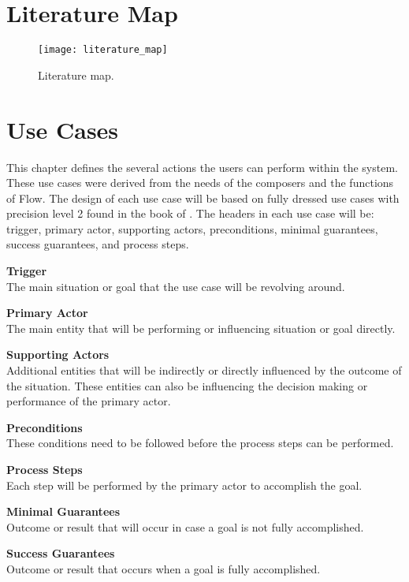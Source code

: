 \chapter{Literature Map}
\label{sec:appendixe}


\begin{sidewaysfigure}[h]
	\texttt{[image: literature\_map]}
    \caption{Literature map.}
    \label{fig:literature-map}
\end{sidewaysfigure}

\chapter{Use Cases}

  This chapter defines the several actions the users can perform within the system. These use cases were derived from the needs of the composers and the functions of Flow. The design of each use case will be based on fully dressed use cases with precision level 2 found in the book of \cite{alistair2001writing}. The headers in each use case will be: trigger, primary actor, supporting actors, preconditions, minimal guarantees, success guarantees, and process steps.

  \textbf{Trigger} \\
  The main situation or goal that the use case will be revolving around. 

  \textbf{Primary Actor} \\
  The main entity that will be performing or influencing situation or goal directly.

  \textbf{Supporting Actors} \\
  Additional entities that will be indirectly or directly influenced by the outcome of the situation. These entities can also be influencing the decision making or performance of the primary actor.

  \textbf{Preconditions} \\
  These conditions need to be followed before the process steps can be performed.

  \textbf{Process Steps} \\
  Each step will be performed by the primary actor to accomplish the goal.

  \textbf{Minimal Guarantees} \\
  Outcome or result that will occur in case a goal is not fully accomplished.

  \textbf{Success Guarantees} \\
  Outcome or result that occurs when a goal is fully accomplished.

